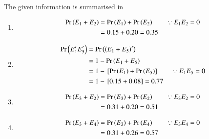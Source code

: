 The given information is summarised in 
%
\begin{enumerate}
\item 
\begin{align} 
	\Pr\left(E_1 + E_2\right) &= \Pr\left(E_1\right) + \Pr\left(E_2\right)   \qquad \because E_1E_2=0\\
	&= 0.15 + 0.20 
	= 0.35
\end{align}
%
\item 
\begin{align} 
	\Pr\left(E_1^{\prime} E_5^{\prime}\right) &=  \Pr\left(\left(E_1 + E_5\right)^{\prime}\right)  \\
	&= 1- \Pr\left(E_1 + E_5\right)\\
	&= 1- {}\left[\Pr\left(E_1\right) + \Pr\left(E_5\right) \right]  \qquad \because E_1E_5=0\\
	&= 1- {}\left[0.15 + 0.08 \right]
	= 0.77\\
\end{align}
%
\item 
\begin{align} 
	\Pr\left(E_3 + E_2\right) &= \Pr\left(E_3\right) + \Pr\left(E_2\right)   \qquad \because E_3E_2=0\\
	&= 0.31 + 0.20 
	= 0.51
\end{align}
\item 
\begin{align} 
	\Pr\left(E_3 + E_4\right) &= \Pr\left(E_3\right) + \Pr\left(E_4\right)   \qquad \because E_3E_4=0\\
	&= 0.31 + 0.26 
	= 0.57
\end{align}
\end{enumerate}



